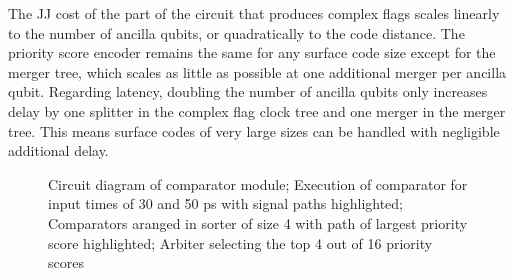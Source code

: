 \documentclass[conference]{IEEEtran}
\begin{document}
The JJ cost of the part of the circuit that produces complex flags scales linearly to the number of ancilla qubits, or quadratically to the code distance.
The priority score encoder remains the same for any surface code size except for the merger tree, which scales as little as possible at one additional merger per ancilla qubit.
Regarding latency, doubling the number of ancilla qubits only increases delay by one splitter in the complex flag clock tree and one merger in the merger tree.
This means surface codes of very large sizes can be handled with negligible additional delay.
    \begin{figure}

\caption[]{
   Circuit diagram of comparator module;
 Execution of comparator for input times of 30 and 50 ps with signal paths highlighted;
 Comparators aranged in sorter of size 4 with path of largest priority score highlighted;
 Arbiter selecting the top 4 out of 16 priority scores}%
    \end{figure}
\end{document}
